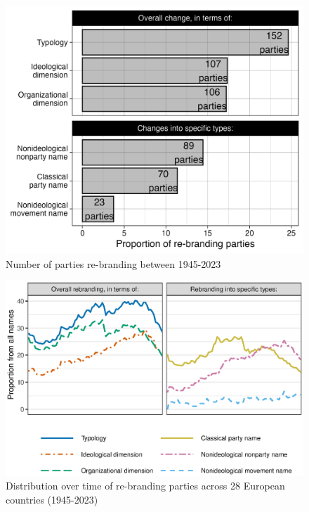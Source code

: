 \documentclass[12pt]{article}
\begin{document}
\begin{figure}[H]
\includegraphics[width=\textwidth]{./Figures/rebranded_parties.png}
\caption{Number of parties re-branding between 1945-2023}
\end{figure}

\clearpage

\begin{figure}[H]
\includegraphics[width=\textwidth]{./Figures/re_branding_timeline.eps}
\caption{Distribution over time of re-branding parties across 28 European countries (1945-2023)}
\label{Fig:re_branding_timeline}
\end{figure}
\end{document}
